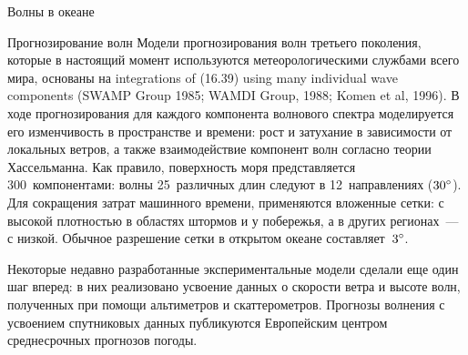 \begin{chapter}{Волны в океане}
\begin{section}{Прогнозирование волн}
Модели прогнозирования волн третьего поколения, которые в настоящий момент
используются метеорологическими службами всего мира, основаны на
integrations of (16.39) using many individual wave components 
(SWAMP Group 1985; WAMDI Group, 1988; Komen et al, 1996). 
В ходе прогнозирования для каждого компонента волнового спектра 
моделируется его изменчивость в пространстве и времени: рост и затухание
в зависимости от локальных ветров, а также взаимодействие компонент волн
согласно теории Хассельманна. Как правило, поверхность моря представляется
300~компонентами: волны 25~различных длин следуют в 12~направлениях 
(${30}^\circ$). Для сокращения затрат машинного времени, применяются
вложенные сетки: с высокой плотностью в областях штормов и у побережья,
а в других регионах~--- с низкой. Обычное разрешение сетки в открытом
океане составляет~${3}^\circ$.
%

Некоторые недавно разработанные экспериментальные модели сделали еще один
шаг вперед: в них реализовано усвоение данных о скорости ветра и высоте волн,
полученных при помощи альтиметров и 
скаттерометров.
Прогнозы волнения с усвоением спутниковых данных публикуются Европейским
центром среднесрочных прогнозов погоды.
%


\end{section}
\end{chapter}
